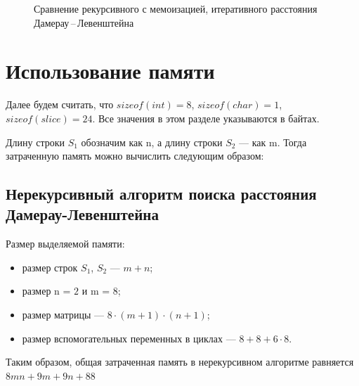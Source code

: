 \newpage

\begin{figure}[ht!]
	\begin{center}
	\end{center}
	\caption{Сравнение рекурсивного с мемоизацией, итеративного расстояния Дамерау\,--\,Левенштейна}
\end{figure}



\section{Использование памяти}

Далее будем считать, что $sizeof(int) = 8$, $sizeof(char) = 1$, $sizeof(slice) = 24$. Все значения в этом разделе указываются в байтах.

Длину строки $S_1$ обозначим как n, а длину строки $S_2$ --- как m. Тогда затраченную память можно вычислить следующим образом:

\subsection{Нерекурсивный алгоритм поиска расстояния Дамерау-Левенштейна}
Размер выделяемой памяти:
\begin{itemize}
	\item размер строк $S_1$, $S_2$ --- $m + n$;
	\item размер n = $2$ и m = $8$;
	\item размер матрицы --- $8 \cdot (m + 1) \cdot (n + 1)$;
	\item размер вспомогательных переменных в циклах --- $8 + 8 + 6 \cdot 8$.
\end{itemize}
Таким образом, общая затраченная память в нерекурсивном алгоритме равняется $8mn + 9m + 9n + 88$


